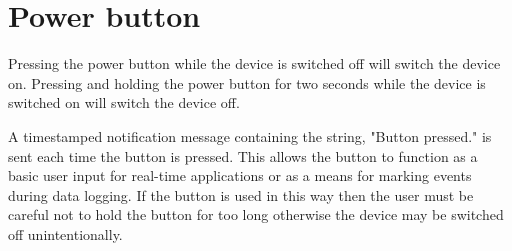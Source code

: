 \section{Power button}

Pressing the power button while the device is switched off will switch the device on.  Pressing and holding the power button for two seconds while the device is switched on will switch the device off.

A timestamped notification message containing the string, "Button pressed." is sent each time the button is pressed.  This allows the button to function as a basic user input for real-time applications or as a means for marking events during data logging.  If the button is used in this way then the user must be careful not to hold the button for too long otherwise the device may be switched off unintentionally.
